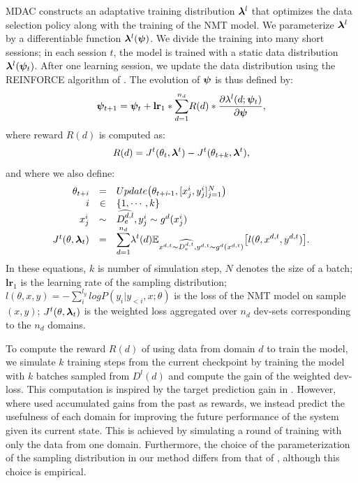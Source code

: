 MDAC constructs an adaptative training distribution $\bm{\lambda}^{l}$ that optimizes the data selection policy along with the training of the NMT model. We parameterize $\bm{\lambda}^{l}$ by a differentiable function $\bm{\lambda}^l(\bm{\psi})$. We divide the training into many short sessions; in each session $t$, the model is trained with a static data distribution $\bm{\lambda}^{l}(\bm{\psi}_t)$. After one learning session, we update the data distribution using the REINFORCE algorithm of \citet{Williams92simple}. The evolution of $\bm{\psi}$ is thus defined by:
\begin{align*}
\bm{\psi}_{t\text{+}1} &= \bm{\psi}_t + \mathbf{lr}_{1} * \displaystyle{\mathop{\sum}_{d=1}^{n_d}} R(d) * \frac{\partial \lambda^l(d;\bm{\psi}_t)}{\partial \bm{\psi}}, \\
\end{align*}
\begingroup
\allowdisplaybreaks
where reward $R(d)$ is computed as:
\begin{align*}
  R(d) = J^t(\theta_t,\bm{\lambda}^t) - J^t(\theta_{t\text{+}k},\bm{\lambda}^t),
\end{align*}
and where we also define:
\begin{equation}
\begin{array}{rcl}
\theta_{t\text{+}i} &=& Update\big(\theta_{t\text{+}i\text{-}1},[x^i_j,y^i_j]_{j=1}^N\big) \\ \nonumber
 i &\in& \{ 1,\cdots,k \} \\
x^i_j &\sim& \widehat{D^{d,l}_e}, y^i_j \sim g^d(x^i_j) \\
J^t(\theta,\bm{\lambda}_t) &=& \displaystyle{\mathop{\sum}_{d=1}^{n_d}}\lambda^t(d)\displaystyle{\mathbb{E}_{x^{d,t} \sim \widehat{D^{d,t}_e},y^{d,t} \sim g^d(x^{d,t})}} \big[ l(\theta,x^{d,t},y^{d,t}) \big].
\end{array}
\end{equation}
\endgroup
In these equations, $k$ is number of simulation step, $N$ denotes the size of a batch; $\mathbf{lr}_{1}$ is the learning rate of the sampling distribution; $l(\theta,x,y) = -\displaystyle{\mathop{\sum}_{i}^{l_y}}log P(y_i|y_{<i},x;\theta)$ is the loss of the NMT model on sample $(x,y)$; $J^t(\theta,\bm{\lambda}_t)$ is the weighted loss aggregated over $n_d$ dev-sets corresponding to the $n_d$ domains.

To compute the reward $R(d)$ of using data from domain $d$ to train the model, we simulate $k$ training steps from the current checkpoint by training the model with $k$ batches sampled from $D^l(d)$ and compute the gain of the weighted dev-loss. This computation is inspired by the target prediction gain in \citet{Graves17automated}. However, where \citet{Graves17automated} used accumulated gains from the past as rewards, we instead predict the usefulness of each domain for improving the future performance of the system given its current state. This is achieved by simulating a round of training with only the data from one domain. Furthermore, the choice of the parameterization of the sampling distribution in our method differs from that of \citet{Graves17automated}, although this choice is empirical.

